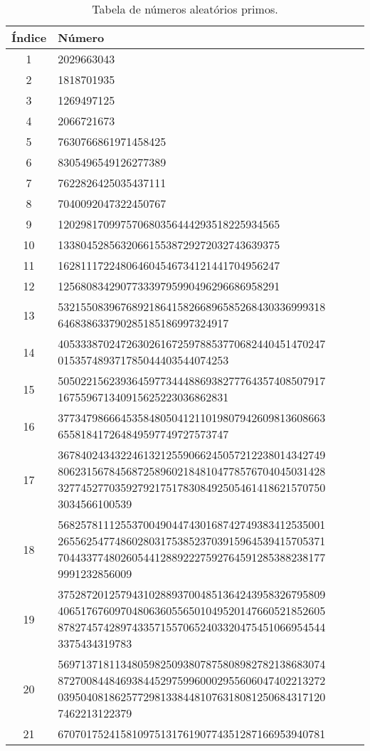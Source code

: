 \documentclass[openany]{ufsctex/ufsctex}
\begin{document}
\begin{longtable}{|c|p{9cm}|}
 \caption{Tabela de números aleatórios primos.}\label{tab:comparacao}\\
  \hline
   	Índice & Número \\ \hline
   	1 & 2029663043\\ \hline 
2 & 1818701935\\ \hline 
3 & 1269497125\\ \hline 
4 & 2066721673\\ \hline 
5 & 7630766861971458425\\ \hline 
6 & 8305496549126277389\\ \hline 
7 & 7622826425035437111\\ \hline 
8 & 7040092047322450767\\ \hline 
9 & 120298170997570680356444293518225934565\\ \hline 
10 & 133804528563206615538729272032743639375\\ \hline 
11 & 162811172248064604546734121441704956247\\ \hline 
12 & 125680834290773339795990496296686958291\\ \hline 
13 & 53215508396768921864158266896585268430336999318
646838633790285185186997324917\\ \hline 
14 & 40533387024726302616725978853770682440451470247
015357489371785044403544074253\\ \hline 
15 & 50502215623936459773444886938277764357408507917
167559671340915625223036862831\\ \hline 
16 & 37734798666453584805041211019807942609813608663
655818417264849597749727573747\\ \hline 
17 & 
36784024343224613212559066245057212238014342749
80623156784568725896021848104778576704045031428
32774527703592792175178308492505461418621570750
3034566100539\\ \hline 
18 & 
56825781112553700490447430168742749383412535001
26556254774860280317538523703915964539415705371
70443377480260544128892227592764591285388238177
9991232856009\\ \hline 
19 & 
37528720125794310288937004851364243958326795809
40651767609704806360556501049520147660521852605
87827457428974335715570652403320475451066954544
3375434319783\\ \hline 
20 & 
56971371811348059825093807875808982782138683074
87270084484693844529759960002955606047402213272
03950408186257729813384481076318081250684317120
7462213122379\\ \hline 
21 & 
67070175241581097513176190774351287166953940781

\end{longtable}
\end{document}
